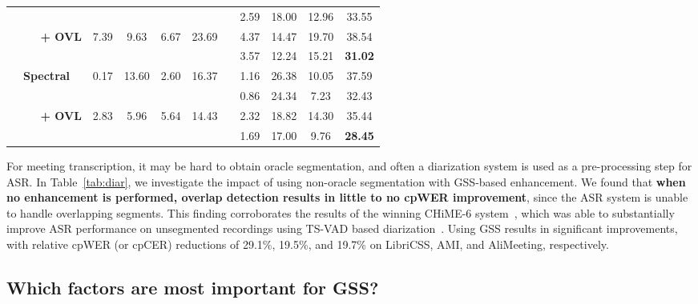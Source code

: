 \documentclass[a4paper]{article}
\newcommand{\cmark}{\ding{51}}\newcommand{\xmark}{\ding{55}}
\begin{document}
\begin{table}[t]
{\begin{tabular}{@{}l@{}lccccccccc@{}}
&  &  &  &  &  & \cmark & 2.59 & 18.00 & 12.96 & 33.55 \\
\cline{2-11}
& \multirow{2}{*}{\textbf{~~ + OVL}} & \multirow{2}{*}{7.39} & \multirow{2}{*}{9.63} & \multirow{2}{*}{6.67} & \multirow{2}{*}{23.69} & \xmark & 4.37 & 14.47 & 19.70 & 38.54 \\
&  &  &  &  &  & \cmark & 3.57 & 12.24 & 15.21 & \textbf{31.02} \\
\hline \hline
\multirow{4}{*}{}
\raisebox{\dimexpr -0.95\totalheight +0.5ex\relax}[0pt][0pt]{\rotatebox{90}{\footnotesize AliMeeting}}\ldelim\{{4}{0.4cm} &
\multirow{2}{*}{\textbf{Spectral}} & \multirow{2}{*}{0.17} & \multirow{2}{*}{13.60} & \multirow{2}{*}{2.60} & \multirow{2}{*}{16.37} & \xmark & 1.16 & 26.38 & 10.05 & 37.59 \\
&  &  &  &  &  & \cmark & 0.86 & 24.34 & 7.23 & 32.43 \\
\cline{2-11}
& \multirow{2}{*}{\textbf{~~ + OVL}} & \multirow{2}{*}{2.83} & \multirow{2}{*}{5.96} & \multirow{2}{*}{5.64} & \multirow{2}{*}{14.43} & \xmark & 2.32 & 18.82 & 14.30 & 35.44 \\
&  &  &  &  &  & \cmark & 1.69 & 17.00 & 9.76 & \textbf{28.45} \\
\bottomrule
\end{tabular}}
\end{table}

For meeting transcription, it may be hard to obtain oracle segmentation, and often a diarization system is used as a pre-processing step for ASR. In Table~\ref{tab:diar}, we investigate the impact of using non-oracle segmentation with GSS-based enhancement. We found that \textbf{when no enhancement is performed, overlap detection results in little to no cpWER improvement}, since the ASR system is unable to handle overlapping segments. This finding corroborates the results of the winning CHiME-6 system~\cite{Medennikov2020TheSS}, which was able to substantially improve ASR performance on unsegmented recordings using TS-VAD based diarization~\cite{Medennikov2020TargetSpeakerVA}. Using GSS results in significant improvements, with relative cpWER (or cpCER) reductions of 29.1\%, 19.5\%, and 19.7\% on LibriCSS, AMI, and AliMeeting, respectively. 

\subsection{Which factors are most important for GSS?}
\end{document}
